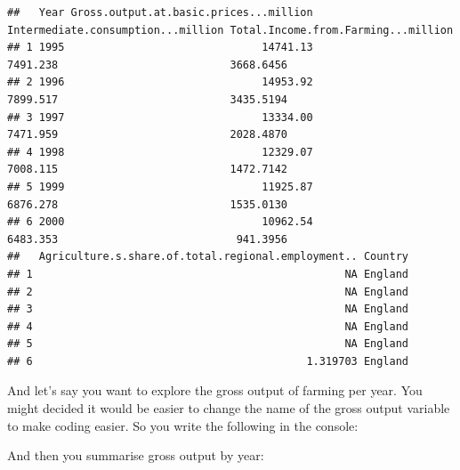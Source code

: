 \documentclass[
]{book}
\newenvironment{Shaded}{\begin{snugshade}}{\end{snugshade}}
\newcommand{\DataTypeTok}[1]{\textcolor[rgb]{0.13,0.29,0.53}{#1}}
\newcommand{\KeywordTok}[1]{\textcolor[rgb]{0.13,0.29,0.53}{\textbf{#1}}}
\newcommand{\NormalTok}[1]{#1}
\newcommand{\OperatorTok}[1]{\textcolor[rgb]{0.81,0.36,0.00}{\textbf{#1}}}
\newcommand{\StringTok}[1]{\textcolor[rgb]{0.31,0.60,0.02}{#1}}
\begin{document}
\begin{verbatim}
##   Year Gross.output.at.basic.prices...million Intermediate.consumption...million Total.Income.from.Farming...million
## 1 1995                               14741.13                           7491.238                           3668.6456
## 2 1996                               14953.92                           7899.517                           3435.5194
## 3 1997                               13334.00                           7471.959                           2028.4870
## 4 1998                               12329.07                           7008.115                           1472.7142
## 5 1999                               11925.87                           6876.278                           1535.0130
## 6 2000                               10962.54                           6483.353                            941.3956
##   Agriculture.s.share.of.total.regional.employment.. Country
## 1                                                 NA England
## 2                                                 NA England
## 3                                                 NA England
## 4                                                 NA England
## 5                                                 NA England
## 6                                           1.319703 England
\end{verbatim}

And let's say you want to explore the gross output of farming per year. You might decided it would be easier to change the name of the gross output variable to make coding easier. So you write the following in the console:

\begin{Shaded}
\end{Shaded}

And then you summarise gross output by year:

\begin{Shaded}
\end{Shaded}
\end{document}
